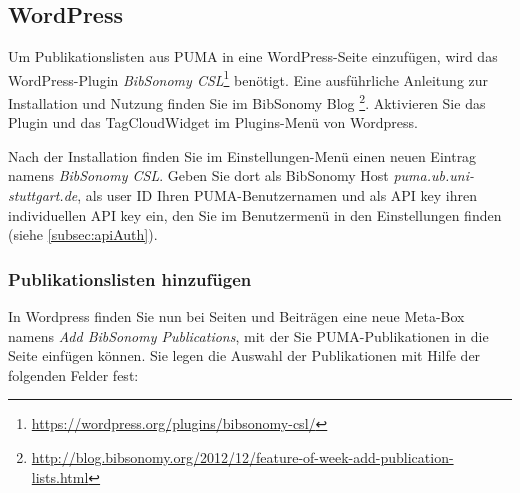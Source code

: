 \subsection{WordPress}
\label{subsec:wordpress}
Um Publikationslisten aus PUMA in eine WordPress-Seite einzufügen, wird das WordPress-Plugin \textit{BibSonomy CSL}\footnote{\url{https://wordpress.org/plugins/bibsonomy-csl/}} benötigt. Eine ausführliche Anleitung zur Installation und Nutzung finden Sie im BibSonomy Blog \footnote{\url{http://blog.bibsonomy.org/2012/12/feature-of-week-add-publication-lists.html}}. Aktivieren Sie das Plugin und das TagCloudWidget im Plugins-Menü von Wordpress.

Nach der Installation finden Sie im Einstellungen-Menü einen neuen Eintrag namens \textit{BibSonomy CSL}. Geben Sie dort als BibSonomy Host \textit{puma.ub.uni-stuttgart.de}, als user ID Ihren PUMA-Benutzernamen und als API key ihren individuellen API key ein, den Sie im Benutzermenü in den Einstellungen finden (siehe \autoref{subsec:apiAuth}).  

\subsubsection*{Publikationslisten hinzufügen}
\label{sss:wordpressPublist}

In Wordpress finden Sie nun bei Seiten und Beiträgen eine neue Meta-Box namens \textit{Add BibSonomy Publications}, mit der Sie PUMA-Publikationen in die Seite einfügen können. Sie legen die Auswahl der Publikationen mit Hilfe der folgenden Felder fest:

